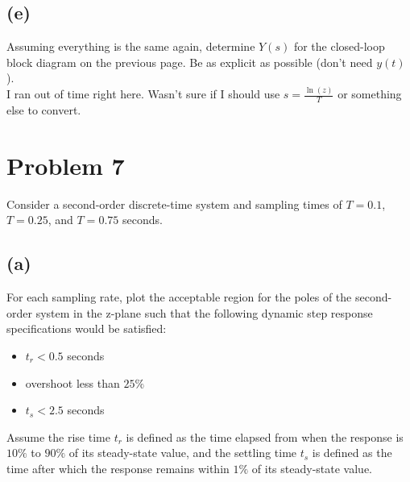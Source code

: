 \documentclass{article}
\begin{document}
\subsection*{(e)}
Assuming everything is the same again, determine $Y(s)$ for the closed-loop block diagram on the previous page. Be as explicit as possible (don't need $y(t)$).\\
I ran out of time right here. Wasn't sure if I should use $s=\frac{\ln(z)}{T}$ or something else to convert.


\section*{Problem 7}
Consider a second-order discrete-time system and sampling times of $T=0.1$, $T=0.25$, and $T=0.75$ seconds.
\subsection*{(a)}
For each sampling rate, plot the acceptable region for the poles of the second-order system in the z-plane such that the following dynamic step response specifications would be satisfied:
\begin{itemize}
    \item $t_r<0.5$ seconds
    \item overshoot less than $25\%$
    \item $t_s<2.5$ seconds
\end{itemize}
Assume the rise time $t_r$ is defined as the time elapsed from when the response is $10\%$ to $90\%$ of its steady-state value, and the settling time $t_s$ is defined as the time after which the response remains within $1\%$ of its steady-state value.\\
\end{document}
